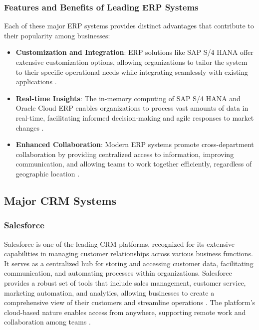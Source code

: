 \subsubsection{Features and Benefits of Leading ERP Systems}

Each of these major ERP systems provides distinct advantages that contribute to their popularity among businesses:

\begin{itemize}
    \item \textbf{Customization and Integration}: ERP solutions like SAP S/4 HANA offer extensive customization options, allowing organizations to tailor the system to their specific operational needs while integrating seamlessly with existing applications \cite{sap_evolution,ptss}.
    \item \textbf{Real-time Insights}: The in-memory computing of SAP S/4 HANA and Oracle Cloud ERP enables organizations to process vast amounts of data in real-time, facilitating informed decision-making and agile responses to market changes \cite{geeksforgeeks,ptss}.
    \item \textbf{Enhanced Collaboration}: Modern ERP systems promote cross-department collaboration by providing centralized access to information, improving communication, and allowing teams to work together efficiently, regardless of geographic location \cite{oracle_erp,software_connect_erp}.
\end{itemize}

\subsection{Major CRM Systems}

\subsubsection{Salesforce}
Salesforce is one of the leading CRM platforms, recognized for its extensive capabilities in managing customer relationships across various business functions. It serves as a centralized hub for storing and accessing customer data, facilitating communication, and automating processes within organizations. Salesforce provides a robust set of tools that include sales management, customer service, marketing automation, and analytics, allowing businesses to create a comprehensive view of their customers and streamline operations \cite{forbes_crm,vofox}. The platform's cloud-based nature enables access from anywhere, supporting remote work and collaboration among teams \cite{vofox}.

